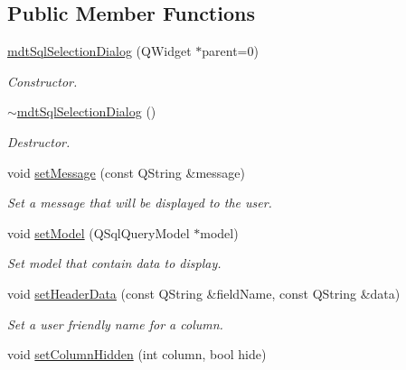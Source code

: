 \subsection*{Public Member Functions}
\begin{DoxyCompactItemize}
\item 
\hypertarget{classmdt_sql_selection_dialog_aaeb4d47e400bff8e58dec9f84f00517c}{
\hyperlink{classmdt_sql_selection_dialog_aaeb4d47e400bff8e58dec9f84f00517c}{mdtSqlSelectionDialog} (QWidget $\ast$parent=0)}
\label{classmdt_sql_selection_dialog_aaeb4d47e400bff8e58dec9f84f00517c}

\begin{DoxyCompactList}\small\item\em Constructor. \end{DoxyCompactList}\item 
\hypertarget{classmdt_sql_selection_dialog_a586e3cb812e5e9634f42cb40bfd2d724}{
\hyperlink{classmdt_sql_selection_dialog_a586e3cb812e5e9634f42cb40bfd2d724}{$\sim$mdtSqlSelectionDialog} ()}
\label{classmdt_sql_selection_dialog_a586e3cb812e5e9634f42cb40bfd2d724}

\begin{DoxyCompactList}\small\item\em Destructor. \end{DoxyCompactList}\item 
\hypertarget{classmdt_sql_selection_dialog_ab5ea543ebded60b4354c7c0902ca021f}{
void \hyperlink{classmdt_sql_selection_dialog_ab5ea543ebded60b4354c7c0902ca021f}{setMessage} (const QString \&message)}
\label{classmdt_sql_selection_dialog_ab5ea543ebded60b4354c7c0902ca021f}

\begin{DoxyCompactList}\small\item\em Set a message that will be displayed to the user. \end{DoxyCompactList}\item 
void \hyperlink{classmdt_sql_selection_dialog_a2434a173f02f098cde6b87ce5defa60d}{setModel} (QSqlQueryModel $\ast$model)
\begin{DoxyCompactList}\small\item\em Set model that contain data to display. \end{DoxyCompactList}\item 
void \hyperlink{classmdt_sql_selection_dialog_afc29f8965c2d6cc103d021ab54298a84}{setHeaderData} (const QString \&fieldName, const QString \&data)
\begin{DoxyCompactList}\small\item\em Set a user friendly name for a column. \end{DoxyCompactList}\item 
\hypertarget{classmdt_sql_selection_dialog_a8b7f8d24a959533ebe434443f19920c7}{
void \hyperlink{classmdt_sql_selection_dialog_a8b7f8d24a959533ebe434443f19920c7}{setColumnHidden} (int column, bool hide)}
\label{classmdt_sql_selection_dialog_a8b7f8d24a959533ebe434443f19920c7}


\end{DoxyCompactItemize}
